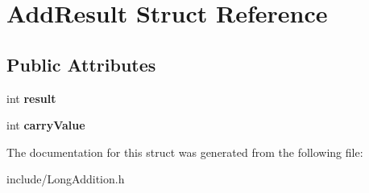 \section{Add\+Result Struct Reference}
\label{struct_add_result}
\subsection*{Public Attributes}
\begin{DoxyCompactItemize}
\item 
\mbox{\label{struct_add_result_ae66aa315e5c177a4d85abe034b59cc58}} 
int {\bfseries result}
\item 
\mbox{\label{struct_add_result_a06d99d9daaebd0528d158e86441fd189}} 
int {\bfseries carry\+Value}
\end{DoxyCompactItemize}


The documentation for this struct was generated from the following file\+:\begin{DoxyCompactItemize}
\item 
include/Long\+Addition.\+h\end{DoxyCompactItemize}
